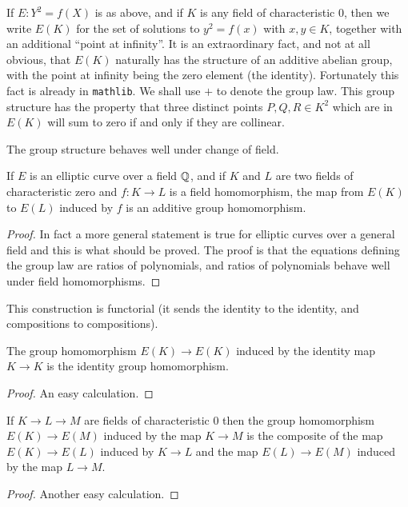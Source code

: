 If $E:Y^2=f(X)$ is as above, and if $K$ is any field of characteristic 0, then we write $E(K)$ for the set of solutions to $y^2=f(x)$ with $x,y\in K$, together with an additional ``point at infinity''. It is an extraordinary fact, and not at all obvious, that $E(K)$ naturally has the structure of an additive abelian group, with the point at infinity being the zero element (the identity). Fortunately this fact is already in {\tt mathlib}. We shall use $+$ to denote the group law. This group structure has the property that three distinct points $P,Q,R\in K^2$ which are in $E(K)$ will sum to zero if and only if they are collinear.

The group structure behaves well under change of field.

\begin{lemma}\label{EllipticCurve.Points.map}\leanok If $E$ is an elliptic curve over a field $\mathbb{Q}$, and if $K$ and $L$ are two fields of characteristic zero and $f:K\to L$ is a field homomorphism, the map from $E(K)$ to $E(L)$ induced by $f$ is an additive group homomorphism. 
\end{lemma}
\begin{proof} In fact a more general statement is true for elliptic curves over a general field and this is what should be proved. The proof is that the equations defining the group law are ratios of polynomials, and ratios of polynomials behave well under field homomorphisms.
\end{proof}

This construction is functorial (it sends the identity to the identity, and compositions to compositions).

\begin{lemma}\label{EllipticCurve.Points.map_id}
  The group homomorphism $E(K)\to E(K)$ induced by the identity map $K\to K$ is the
  identity group homomorphism.
\end{lemma}
\begin{proof} An easy calculation.
\end{proof}

\begin{lemma}\label{EllipticCurve.Points.map_comp}
  If $K\to L\to M$ are fields of characteristic 0 then the group homomorphism $E(K)\to E(M)$
  induced by the map $K\to M$ is the composite of the map $E(K)\to E(L)$ induced by $K\to L$
  and the map $E(L)\to E(M)$ induced by the map $L\to M$.
\end{lemma}
\begin{proof} Another easy calculation.
\end{proof}

